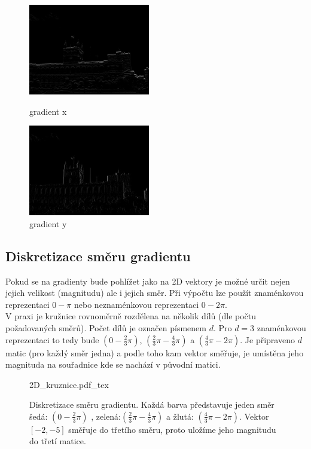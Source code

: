 \documentclass{report}
\begin{document}
\begin{figure}[H]
	\centering
	\begin{minipage}[c]{150pt}
		\centering
		\includegraphics[width=150pt]{./img/gradientX.png}
		\caption{gradient x}
	\end{minipage}
	\begin{minipage}[c]{150pt}
		\includegraphics[width=150pt]{./img/gradientY.png}
		\caption{gradient y}
		\centering
	\end{minipage}
\end{figure}

\subsection{Diskretizace směru gradientu}
Pokud se na gradienty bude pohlížet jako na 2D vektory je možné určit nejen jejich velikost (magnitudu) ale i jejich směr. Při výpočtu lze použít znaménkovou reprezentaci $0 - \pi$ nebo neznaménkovou reprezentaci $0 - 2\pi$. \\
V praxi je kružnice rovnoměrně rozdělena na několik dílů (dle počtu požadovaných směrů). Počet dílů  je označen písmenem $d$. Pro $d = 3$ znaménkovou reprezentaci to tedy bude $\left(0 - \frac{2}{3}\pi \right)$, $\left(\frac{2}{3}\pi - \frac{4}{3}\pi \right)$ a $\left(\frac{4}{3}\pi - 2\pi \right)$. Je připraveno $d$ matic (pro každý směr jedna) a podle toho kam vektor směřuje, je umístěna jeho magnituda na souřadnice kde se nachází v původní matici. 

\begin{figure}[H]
    \centering    
    \def\svgwidth{230pt}
	{2D_kruznice.pdf_tex}    
    \caption{Diskretizace směru gradientu. Každá barva představuje jeden směr šedá: $\left(0 - \frac{2}{3}\pi \right)$ , zelená:$\left(\frac{2}{3}\pi - \frac{4}{3}\pi \right)$ a žlutá: $\left(\frac{4}{3}\pi - 2\pi \right)$. Vektor $[ -2, -5 ]$ směřuje do třetího směru, proto uložíme jeho magnitudu do třetí matice. }
    \label{fig: 2D_graf}
\end{figure}
\end{document}
